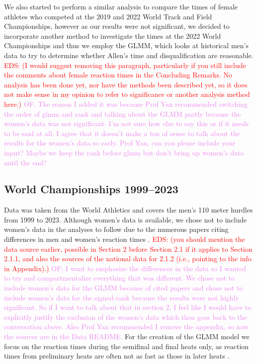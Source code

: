 \documentclass[12pt, letterpaper, titlepage]{article}
\newcommand{\eds}[1]{\textcolor{red}{EDS: (#1)}}
\newcommand{\of}[1]{\textcolor{violet}{OF: #1}}
\begin{document}
We also started to perform a similar analysis to compare the times of female 
athletes who competed at the 2019 and 2022 World Track and Field Championships,
however as our results were not significant, we decided to incorporate another
method to investigate the times at the 2022 World Championships and thus we
employ the GLMM, which looks at historical men's data to try to determine
whether Allen's time and disqualification are reasonable. 
\eds{I would suggest removing this paragraph, particularly if you still include
the comments about female reaction times in the Concluding Remarks. 
No analysis has been done yet, nor have the methods been described yet, so it 
does not make sense in my opinion 
to refer to significance or another analysis method here.}
\of{The reason I added it was because Prof Yan recommended switching the
order of glmm and rank and talking about the GLMM partly because the women's
data was not significant. I'm not sure how else to say this or if it needs to
be said at all.  I agree that it doesn't make a ton of sense to talk about the 
results for the women's data so early.  Prof Yan, can you please include your
input? Maybe we keep the rank before glmm but don't bring up women's data until
the end?}

\subsection{World Championships 1999--2023}\label{sec:dataworld}


Data was taken from the World Athletics 
and covers the men's 110 meter hurdles from 1999 to 2023.
Although women's data is available, we chose not to include women's data in the
analyses to follow due to the numerous papers citing differences in men and
women's reaction times \citep[e.g.,][]{lipps2011implications, 
babicc2009reaction, panoutsakopoulos2020gender}.
\eds{you should mention the data source earlier, possible in Section 2 
before Section 2.1 if it applies to Section 2.1.1, and also the sources of the 
national data for 2.1.2 (i.e., pointing to the info in Appendix).}
\of{I want to emphasize the differences in the data so I wanted to try and
compartmentalize everything that was different. We chose not to include women's
data for the GLMM because of cited papers and chose not to include women's
data for the signed-rank because the results were not highly significant. So if
I want to talk about that in section 2, I feel like I would have to explicitly
justify the exclusion of the women's data which then goes back to the
conversation above. Also Prof Yan recommended I remove the appendix, so now the
sources are in the Data README.}
For the creation of the GLMM model we focus on the reaction times during the 
semifinal and final heats only, as reaction times from preliminary heats are 
often not as fast as those in later heats \citep[e.g.,][]{zhang2021correlation}. 
\end{document}
